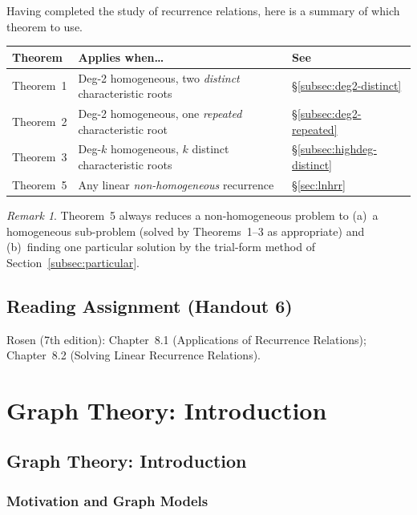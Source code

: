 \documentclass[11pt, a4paper, notitlepage]{report}
\theoremstyle{definition}
\theoremstyle{remark}
\newtheorem{remark}[theorem]{Remark}
\begin{document}
Having completed the study of recurrence relations, here is a summary of which theorem to use.

\begin{center}
\renewcommand{\arraystretch}{1.4}
\begin{tabular}{lll}
\hline
\textbf{Theorem} & \textbf{Applies when\ldots} & \textbf{See} \\
\hline
Theorem~1 & Deg-2 homogeneous, two \emph{distinct} characteristic roots & \S\ref{subsec:deg2-distinct} \\
Theorem~2 & Deg-2 homogeneous, one \emph{repeated} characteristic root & \S\ref{subsec:deg2-repeated} \\
Theorem~3 & Deg-$k$ homogeneous, $k$ distinct characteristic roots & \S\ref{subsec:highdeg-distinct} \\
Theorem~5 & Any linear \emph{non-homogeneous} recurrence & \S\ref{sec:lnhrr} \\
\hline
\end{tabular}
\end{center}

\begin{remark}
Theorem~5 always reduces a non-homogeneous problem to (a)~a homogeneous sub-problem
(solved by Theorems~1--3 as appropriate) and (b)~finding one particular solution by the
trial-form method of Section~\ref{subsec:particular}.
\end{remark}

\section*{Reading Assignment (Handout 6)}
Rosen (7th edition): Chapter~8.1 (Applications of Recurrence Relations);
Chapter~8.2 (Solving Linear Recurrence Relations).

\chapter{Graph Theory: Introduction}
\label{chap:graph-theory}

\section{Graph Theory: Introduction}
\label{sec:graph-theory-1}

\subsection{Motivation and Graph Models}
\label{subsec:graph-motivation}
\end{document}
